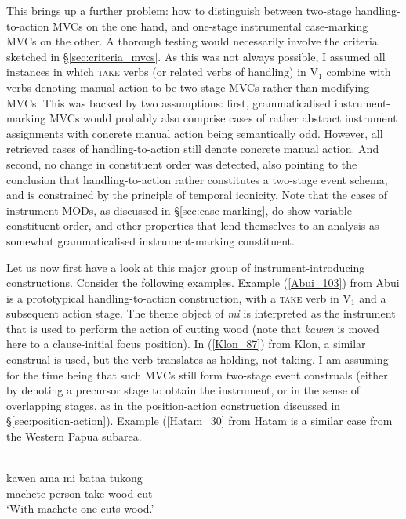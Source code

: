 This brings up a further problem: how to distinguish between two-stage handling-to-action MVCs on the one hand, and one-stage instrumental case-marking MVCs on the other. A thorough testing would necessarily involve the criteria sketched in §\ref{sec:criteria_mvcs}. As this was not always possible, I assumed all instances in which \textsc{take} verbs (or related verbs of handling) in V$_1$ combine with verbs denoting manual action to be two-stage MVCs rather than modifying MVCs. This was backed by two assumptions: first, grammaticalised instrument-marking MVCs would probably also comprise cases of rather abstract instrument assignments with concrete manual action being semantically odd. However, all retrieved cases of handling-to-action still denote concrete manual action. And second, no change in constituent order was detected, also pointing to the conclusion that handling-to-action rather constitutes a two-stage event schema, and is constrained by the principle of temporal iconicity. Note that the cases of instrument MODs, as discussed in §\ref{sec:case-marking}, do show variable constituent order, and other properties that lend themselves to an analysis as somewhat grammaticalised instrument-marking constituent.

Let us now first have a look at this major group of instrument-introducing constructions. Consider the following examples. Example (\ref{Abui_103}) from Abui is a prototypical handling-to-action construction, with a \textsc{take} verb in V$_1$ and a subsequent action stage. The theme object of \textit{mi} is interpreted as the instrument that is used to perform the action of cutting wood (note that \textit{kawen} is moved here to a clause-initial focus position). In (\ref{Klon_87}) from Klon, a similar construal is used, but the verb translates as holding, not taking. I am assuming for the time being that such MVCs still form two-stage event construals (either by denoting a precursor stage to obtain the instrument, or in the sense of overlapping stages, as in the position-action construction discussed in §\ref{sec:position-action}). Example (\ref{Hatam_30} from Hatam is a similar case from the Western Papua subarea.

\ea \label{Abui_103}
\\
\gll kawen ama mi bataa tukong \\
machete person take wood cut \\
\glft `With machete one cuts wood.'\\ 
\z

